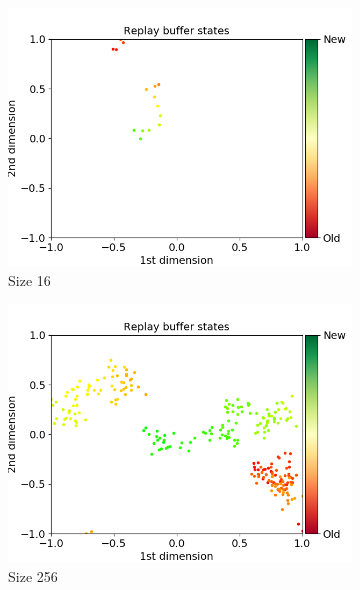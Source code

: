 \documentclass{article}
\begin{document}
\begin{figure}[H]
    \begin{subfigure}[b]{0.3\linewidth}
    \includegraphics[width=\linewidth]{Study_1/buffer/sequential_16.png}
    \caption{Size 16}
  \end{subfigure}
  \begin{subfigure}[b]{0.3\linewidth}
    \includegraphics[width=\linewidth]{Study_1/buffer/sequential_256.png}
      \caption{Size 256}
  \end{subfigure}
   \begin{subfigure}[b]{0.3\linewidth}

\end{subfigure}
\end{figure}
\end{document}
